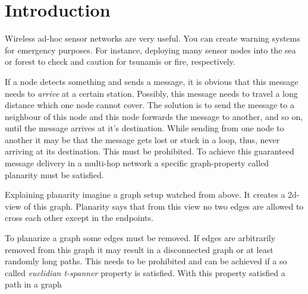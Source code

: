 \section{Introduction}
Wireless ad-hoc sensor networks are very useful. 
You can create warning systems for emergency purposes.
For instance, deploying many sensor nodes into the sea or forest to check and caution for tsunamis or fire, respectively.

If a node detects something and sends a message, it is obvious that this message needs to \emph{arrive} at a certain station.
Possibly, this message needs to travel a long distance which one node cannot cover.
The solution is to send the message to a neighbour of this node and this node forwards the message to another, and so on, until the message arrives at it's destination.
While sending from one node to another it may be that the message gets lost or stuck in a loop, thus, never arriving at its destination.
This must be prohibited.
To achieve this guaranteed message delivery in a multi-hop network a specific graph-property called planarity must be satisfied.

Explaining planarity imagine a graph setup watched from above. 
It creates a 2d-view of this graph.
Planarity says that from this view no two edges are allowed to cross each other except in the endpoints.

To planarize a graph some edges must be removed.
If edges are arbitrarily removed from this graph it may result in a disconnected graph or at least randomly long paths.
This needs to be prohibited and can be achieved if a so called \emph{euclidian t-spanner} property is satisfied.
With this property satisfied a path in a graph 

